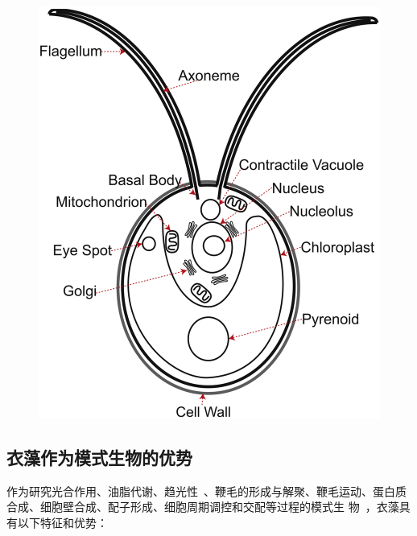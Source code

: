 \begin{figure}[!htbp]
\centering
\graphicspath{{figures/}}
\includegraphics[width=\textwidth-80mm]{fig2-1.jpg}
{
\par}
\end{figure}

\subsection{衣藻作为模式生物的优势}
作为研究光合作用、油脂代谢、趋光性\ \citep{Kianianmomeni2014}、鞭毛的形成与解聚、鞭毛运动、蛋白质合成、细胞壁合成、配子形成、细胞周期调控和交配等过程的模式生
物\ \citep{Mussgnug2015,Gallaher2015,Flowers2015}，衣藻具有以下特征和优势：

